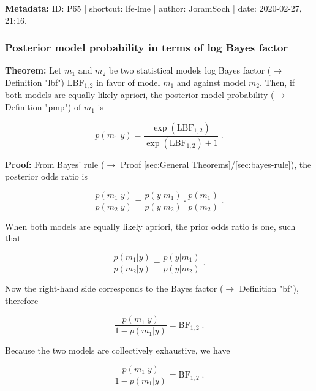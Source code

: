 \documentclass[a4paper,12pt]{book}
\begin{document}
\vspace{1em}
\textbf{Metadata:} ID: P65 | shortcut: lfe-lme | author: JoramSoch | date: 2020-02-27, 21:16.


\subsubsection[\textbf{Posterior model probability in terms of log Bayes factor}]{Posterior model probability in terms of log Bayes factor} \label{sec:pmp-lbf}

\vspace{1em}
\textbf{Theorem:} Let $m_1$ and $m_2$ be two statistical models log Bayes factor ($\rightarrow$ Definition "lbf") $\mathrm{LBF}_{1,2}$ in favor of model $m_1$ and against model $m_2$. Then, if both models are equally likely apriori, the posterior model probability ($\rightarrow$ Definition "pmp") of $m_1$ is

\begin{equation} \label{eq:pmp-lbf-PMP-LBF}
p(m_1|y) = \frac{\exp(\mathrm{LBF}_{1,2})}{\exp(\mathrm{LBF}_{1,2}) + 1} \; .
\end{equation}


\vspace{1em}
\textbf{Proof:} From Bayes' rule ($\rightarrow$ Proof \ref{sec:General Theorems}/\ref{sec:bayes-rule}), the posterior odds ratio is

\begin{equation} \label{eq:pmp-lbf-post-odds-s1}
\frac{p(m_1|y)}{p(m_2|y)} = \frac{p(y|m_1)}{p(y|m_2)} \cdot \frac{p(m_1)}{p(m_2)} \; .
\end{equation}

When both models are equally likely apriori, the prior odds ratio is one, such that

\begin{equation} \label{eq:pmp-lbf-post-odds-s2}
\frac{p(m_1|y)}{p(m_2|y)} = \frac{p(y|m_1)}{p(y|m_2)} \; .
\end{equation}

Now the right-hand side corresponds to the Bayes factor ($\rightarrow$ Definition "bf"), therefore

\begin{equation} \label{eq:pmp-lbf-post-odds-s4}
\frac{p(m_1|y)}{1-p(m_1|y)} = \mathrm{BF}_{1,2} \; .
\end{equation}

Because the two models are collectively exhaustive, we have

\begin{equation} \label{eq:pmp-lbf-post-odds-s3}
\frac{p(m_1|y)}{1-p(m_1|y)} = \mathrm{BF}_{1,2} \; .
\end{equation}
\end{document}
